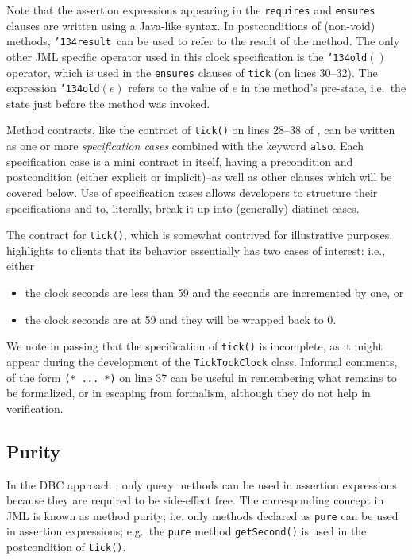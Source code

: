\documentclass{llncs}
\def\old{\texttt{\char'134old}}
\def\result{\texttt{\char'134result}}
\begin{document}
Note that the assertion expressions appearing in the \texttt{requires} and
\texttt{ensures} clauses are written using a Java-like syntax.
%
\GMARGIN{\old}
\MARGIN{\result}
%
In postconditions of (non-void) methods, \result\ can be used to refer to the 
result of the method.
The only other JML specific operator used in this clock specification is the
\old$()$ operator, which is used in the \texttt{ensures} clauses of
\texttt{tick} (on lines 30--32).  The 
expression \old$(e)$ refers to the value of $e$ in the method's pre-state,
i.e.\ the state just before the method was invoked.

Method contracts, like the contract of \texttt{tick()} on lines 28--38
of , can be written as one or
more \emph{specification cases} combined with the keyword \texttt{also}.
Each specification case is a mini contract in itself, having a precondition
and postcondition (either explicit or implicit)--as well as other clauses
which will be covered below.
Use of specification cases allows developers to structure their
specifications and to, literally, break it up into (generally) distinct cases.

The contract for \texttt{tick()},
which is somewhat contrived for illustrative purposes,
highlights to clients that its behavior 
essentially has two cases of interest: i.e., either 
\begin{itemize}
  \item the clock seconds are less than 59 and the seconds are incremented by one,
    or
  \item the clock seconds are at 59 and they will be wrapped back to 0.
\end{itemize}
%
We note in passing that the specification of \texttt{tick()} is incomplete, as
it might appear during the development of the \texttt{TickTockClock} class.
Informal comments, of the form \texttt{(* ... *)} on line 37 can be useful in
remembering what remains to be formalized, or in escaping from
formalism, although they do not help in verification. 

\subsection{Purity}
%
In the DBC approach \cite{Meyer97}, only query methods can be used in assertion
expressions because they are required to be side-effect free.
% 
The corresponding concept in JML is known as method purity; i.e. only methods
declared as \texttt{pure} can be used in assertion expressions; e.g.\ the
\texttt{pure} method \texttt{getSecond()} is used in the postcondition of
\texttt{tick()}.
%
\end{document}
